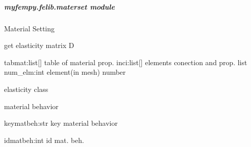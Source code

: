 \documentclass[letterpaper,10pt,english]{sphinxmanual}
\begin{document}
\subparagraph{myfempy.felib.materset module}
\label{\detokenize{myfempy.felib:module-myfempy.felib.materset}}\label{\detokenize{myfempy.felib:myfempy-felib-materset-module}}
\sphinxAtStartPar
Material Setting

\begin{fulllineitems}
\label{\detokenize{myfempy.felib:myfempy.felib.materset.get_elasticity}}
\pysigstartsignatures
{}
\pysigstopsignatures
\sphinxAtStartPar
get elasticity matrix D
\begin{description}
\sphinxAtStartPar
tabmat:list{[}{]} \textendash{} table of material prop.
inci:list{[}{]}   \textendash{} elements conection and prop. list
num\_elm:int   \textendash{} element(in mesh) number

\sphinxAtStartPar
elasticity class

\end{description}

\end{fulllineitems}


\begin{fulllineitems}
\label{\detokenize{myfempy.felib:myfempy.felib.materset.mat_beh}}
\pysigstartsignatures
{}
\pysigstopsignatures
\sphinxAtStartPar
material behavior
\begin{description}
\sphinxAtStartPar
keymatbeh:str \textendash{} key material behavior

\sphinxAtStartPar
idmatbeh:int  \textendash{} id mat. beh.

\end{description}

\end{fulllineitems}
\end{document}

